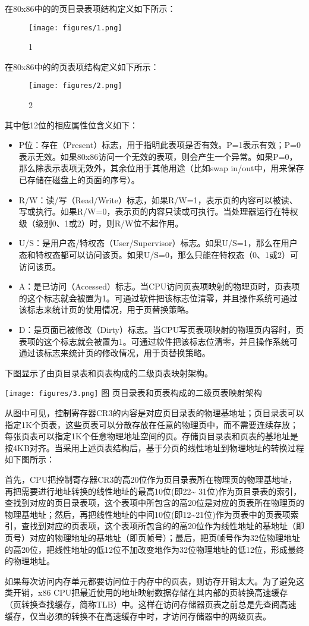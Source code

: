 在80x86中的的页目录表项结构定义如下所示：

\begin{figure}[htbp]
\centering
\texttt{[image: figures/1.png]}
\caption{1}
\end{figure}

在80x86中的的页表项结构定义如下所示：

\begin{figure}[htbp]
\centering
\texttt{[image: figures/2.png]}
\caption{2}
\end{figure}

其中低12位的相应属性位含义如下：

\begin{itemize}
\tightlist
\item
  P位：存在（Present）标志，用于指明此表项是否有效。P=1表示有效；P=0表示无效。如果80x86访问一个无效的表项，则会产生一个异常。如果P=0，那么除表示表项无效外，其余位用于其他用途（比如swap
  in/out中，用来保存已存储在磁盘上的页面的序号）。
\item
  R/W：读/写（Read/Write）标志，如果R/W=1，表示页的内容可以被读、写或执行。如果R/W=0，表示页的内容只读或可执行。当处理器运行在特权级（级别0、1或2）时，则R/W位不起作用。
\item
  U/S：是用户态/特权态（User/Supervisor）标志。如果U/S=1，那么在用户态和特权态都可以访问该页。如果U/S=0，那么只能在特权态（0、1或2）可访问该页。
\item
  A：是已访问（Accessed）标志。当CPU访问页表项映射的物理页时，页表项的这个标志就会被置为1。可通过软件把该标志位清零，并且操作系统可通过该标志来统计页的使用情况，用于页替换策略。
\item
  D：是页面已被修改（Dirty）标志。当CPU写页表项映射的物理页内容时，页表项的这个标志就会被置为1。可通过软件把该标志位清零，并且操作系统可通过该标志来统计页的修改情况，用于页替换策略。
\end{itemize}

下图显示了由页目录表和页表构成的二级页表映射架构。

\texttt{[image: figures/3.png]} 图 页目录表和页表构成的二级页表映射架构

从图中可见，控制寄存器CR3的内容是对应页目录表的物理基地址；页目录表可以指定1K个页表，这些页表可以分散存放在任意的物理页中，而不需要连续存放；每张页表可以指定1K个任意物理地址空间的页。存储页目录表和页表的基地址是按4KB对齐。当采用上述页表结构后，基于分页的线性地址到物理地址的转换过程如下图所示：

首先，CPU把控制寄存器CR3的高20位作为页目录表所在物理页的物理基地址，再把需要进行地址转换的线性地址的最高10位(即22\textasciitilde{}
31位)作为页目录表的索引，查找到对应的页目录表项，这个表项中所包含的高20位是对应的页表所在物理页的物理基地址；然后，再把线性地址的中间10位(即12\textasciitilde{}21位)作为页表中的页表项索引，查找到对应的页表项，这个表项所包含的的高20位作为线性地址的基地址（即页号）对应的物理地址的基地址（即页帧号）；最后，把页帧号作为32位物理地址的高20位，把线性地址的低12位不加改变地作为32位物理地址的低12位，形成最终的物理地址。

如果每次访问内存单元都要访问位于内存中的页表，则访存开销太大。为了避免这类开销，x86
CPU把最近使用的地址映射数据存储在其内部的页转换高速缓存（页转换查找缓存，简称TLB）中。这样在访问存储器页表之前总是先查阅高速缓存，仅当必须的转换不在高速缓存中时，才访问存储器中的两级页表。
